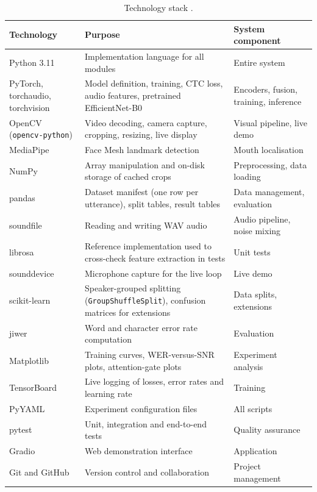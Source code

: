 \begin{table}[H]
\centering
\caption{Technology stack \rec.}
\label{tab:stack}
\small
\begin{tabularx}{\textwidth}{@{}p{3.3cm}Xp{3.9cm}@{}}
\toprule
\textbf{Technology} & \textbf{Purpose} & \textbf{System component} \\
\midrule
Python 3.11 & Implementation language for all modules & Entire system \\
PyTorch, torchaudio, torchvision & Model definition, training, CTC loss, audio
features, pretrained EfficientNet-B0 & Encoders, fusion, training, inference \\
OpenCV (\texttt{opencv-python}) & Video decoding, camera capture, cropping,
resizing, live display & Visual pipeline, live demo \\
MediaPipe & Face Mesh landmark detection~\cite{lugaresi2019,kartynnik2019} &
Mouth localisation \\
NumPy & Array manipulation and on-disk storage of cached crops & Preprocessing,
data loading \\
pandas & Dataset manifest (one row per utterance), split tables, result tables &
Data management, evaluation \\
soundfile & Reading and writing WAV audio & Audio pipeline, noise mixing \\
librosa & Reference implementation used to cross-check feature extraction in
tests & Unit tests \\
sounddevice & Microphone capture for the live loop & Live demo \\
scikit-learn & Speaker-grouped splitting (\texttt{GroupShuffleSplit}), confusion
matrices for extensions & Data splits, extensions \\
jiwer & Word and character error rate computation & Evaluation \\
Matplotlib & Training curves, WER-versus-SNR plots, attention-gate plots &
Experiment analysis \\
TensorBoard & Live logging of losses, error rates and learning rate & Training \\
PyYAML & Experiment configuration files & All scripts \\
pytest & Unit, integration and end-to-end tests & Quality assurance \\
Gradio & Web demonstration interface & Application \\
Git and GitHub & Version control and collaboration & Project management \\
\bottomrule
\end{tabularx}
\end{table}

